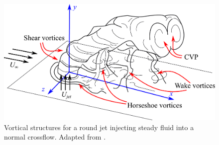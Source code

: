 \begin{figure}
    \centering
    \includegraphics[width = 0.7\linewidth]{figures/JICF.pdf}
    \caption{Vortical structures for a round jet injecting steady fluid into a normal crossflow. Adapted from \citet{Karagozian2014revJICF}.}
    \label{fig:JICF}
\end{figure}

